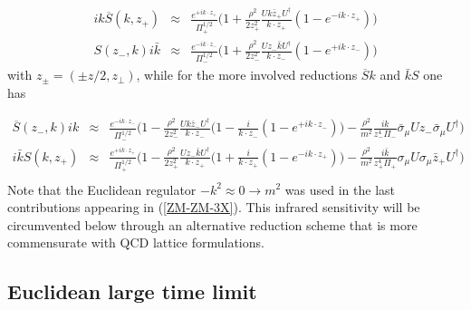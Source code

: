 \documentclass[11pt,aps,amsmath,amssymb,nofootinbib,notitlepage,longbibliography]{revtex4-1}
\begin{document}
\begin{eqnarray}
\label{ZM-ZM-3}
ik\overline{S}(k,z_+)&\approx& \frac{e^{+ik\cdot z_+}}{\Pi^{1/2}_+}
\bigg(1+\frac {\rho^2}{2z_+^2}\frac{Uk\bar{z}_+U^\dagger}{k\cdot z_+}(1-e^{-ik\cdot z_+})\bigg)
\nonumber\\
{S}(z_-,k)i\bar k&\approx& \frac{e^{-ik\cdot z_-}}{\Pi^{1/2}_-}
\bigg(1+\frac {\rho^2}{2z_-^2}\frac{Uz_-\bar{k}U^\dagger}{k\cdot z_-}(1-e^{+ik\cdot z_-})\bigg)
\end{eqnarray}
with $z_\pm =(\pm z/2, z_\perp)$, while for  the more involved reductions
$\overline S k$ and $\bar k S$ one has~\cite{Shuryak:2020ktq}


\begin{eqnarray}
\label{ZM-ZM-3X}
\overline{S}(z_-,k)ik&\approx&
 \frac{e^{-ik\cdot z_-}}{\Pi^{1/2}_-}
 \bigg(1-\frac{\rho^2}{2z_-^2}\frac{U k\bar z_- U^\dagger}{k\cdot z_-}\bigg(1-\frac {i}{k\cdot z_-}(1-e^{+ik\cdot z_-})\bigg)
- \frac {\rho^2}{m^2}\frac {ik}{z_-^4\Pi_-}\bar\sigma_\mu U {z}_- \bar\sigma_\mu U^\dagger\bigg)
\nonumber\\
i\bar k{S}(k,z_+)&\approx&
\frac{e^{+ik\cdot z_+}}{\Pi^{1/2}_+}
 \bigg(1-\frac{\rho^2}{2z_+^2}\frac{Uz_-\bar k U^\dagger}{k\cdot z_+}\bigg(1+\frac i{k\cdot z_+}(1-e^{-ik\cdot z_+})\bigg)
- \frac {\rho^2}{m^2}\frac {i\bar k}{z_+^4\Pi_+}\sigma_\mu U \sigma_\mu  \bar{z}_+U^\dagger\bigg)\nonumber\\
\end{eqnarray}
Note that the  Euclidean regulator $-k^2\approx 0\rightarrow m^2$ was used in the last contributions
appearing in (\ref{ZM-ZM-3X}). This infrared sensitivity will be circumvented below through an alternative reduction
scheme that is more commensurate with QCD lattice formulations.




\subsection{Euclidean large   time limit}
\end{document}
